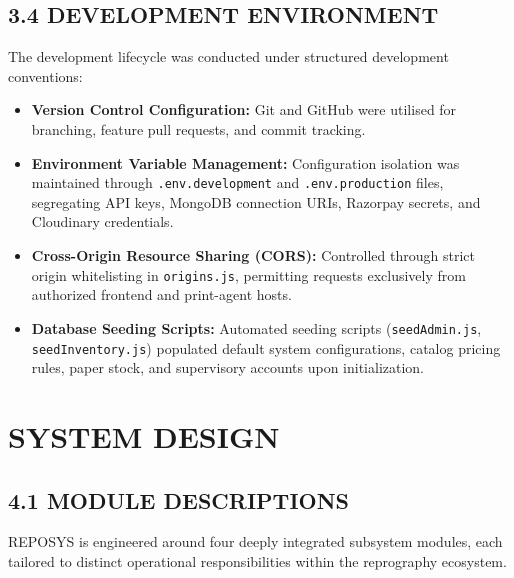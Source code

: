 \documentclass[12pt,a4paper,oneside]{report}
\begin{document}
\section{3.4 DEVELOPMENT ENVIRONMENT}
The development lifecycle was conducted under structured development conventions:
\begin{itemize}[leftmargin=0.35in, itemsep=2pt]
  \item \textbf{Version Control Configuration:} Git and GitHub were utilised for branching, feature pull requests, and commit tracking.
  \item \textbf{Environment Variable Management:} Configuration isolation was maintained through \texttt{.env.development} and \texttt{.env.production} files, segregating API keys, MongoDB connection URIs, Razorpay secrets, and Cloudinary credentials.
  \item \textbf{Cross-Origin Resource Sharing (CORS):} Controlled through strict origin whitelisting in \texttt{origins.js}, permitting requests exclusively from authorized frontend and print-agent hosts.
  \item \textbf{Database Seeding Scripts:} Automated seeding scripts (\texttt{seedAdmin.js}, \texttt{seedInventory.js}) populated default system configurations, catalog pricing rules, paper stock, and supervisory accounts upon initialization.
\end{itemize}

\chapter{SYSTEM DESIGN}

\section{4.1 MODULE DESCRIPTIONS}
REPOSYS is engineered around four deeply integrated subsystem modules, each tailored to distinct operational responsibilities within the reprography ecosystem.
\end{document}
